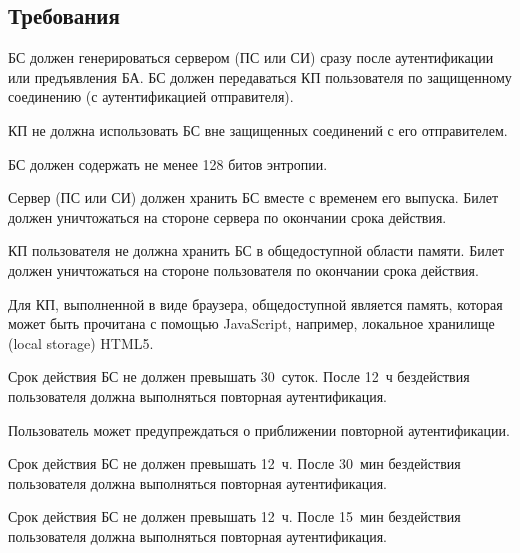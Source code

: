 \subsection{Требования}\label{SM.Reqs}

БС должен генерироваться сервером (ПС или СИ) сразу после аутентификации или 
предъявления БА. БС должен передаваться КП пользователя по защищенному 
соединению (с аутентификацией отправителя). 

КП не должна использовать БС вне защищенных соединений с его отправителем. 

БС должен содержать не менее 128 битов энтропии.


Сервер (ПС или СИ) должен хранить БС вместе с временем его выпуска.
Билет должен уничтожаться на стороне сервера по окончании срока действия.

КП пользователя не должна хранить БС в общедоступной области памяти.
Билет должен уничтожаться на стороне пользователя по окончании срока действия.

\begin{note*}
Для КП, выполненной в виде браузера, общедоступной является память,
которая может быть прочитана с помощью JavaScript, например,
локальное хранилище (local storage) HTML5.
%
\end{note*}

Срок действия БС не должен превышать 30~суток. После 12~ч бездействия 
пользователя должна выполняться повторная аутентификация.

\begin{note*}
Пользователь может предупреждаться о приближении повторной аутентификации.
\end{note*}

Срок действия БС не должен превышать 12~ч. После 30~мин бездействия 
пользователя должна выполняться повторная аутентификация. 

Срок действия БС не должен превышать 12~ч. После 15~мин бездействия 
пользователя должна выполняться повторная аутентификация.

